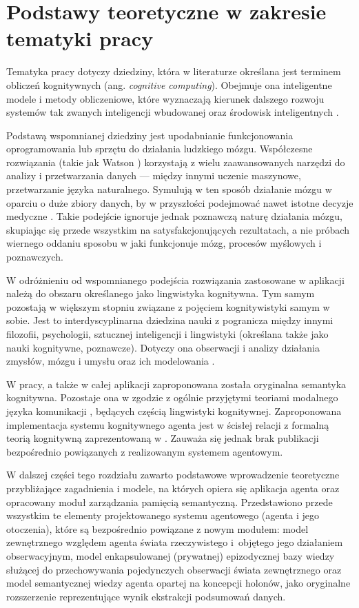 
\chapter{Podstawy teoretyczne w zakresie tematyki pracy}

Tematyka pracy dotyczy dziedziny, która w literaturze określana jest terminem obliczeń kognitywnych (ang. \textit{cognitive computing}). Obejmuje ona inteligentne modele i metody obliczeniowe, które wyznaczają kierunek dalszego rozwoju systemów tak zwanych inteligencji wbudowanej oraz środowisk inteligentnych \cite{hur15}.

Podstawą wspomnianej dziedziny jest upodabnianie funkcjonowania oprogramowania lub sprzętu do działania ludzkiego mózgu. Współczesne rozwiązania (takie jak  Watson \cite{kel13}) korzystają z wielu zaawansowanych narzędzi do analizy i przetwarzania danych --- między innymi uczenie maszynowe, przetwarzanie języka naturalnego. Symulują w ten sposób działanie mózgu w oparciu o duże zbiory danych, by w przyszłości podejmować nawet istotne decyzje medyczne \cite{woo15}. Takie podejście ignoruje jednak poznawczą naturę działania mózgu, skupiając się przede wszystkim na satysfakcjonujących rezultatach, a nie próbach wiernego oddaniu sposobu w jaki funkcjonuje mózg, procesów myślowych i poznawczych.

W odróżnieniu od wspomnianego podejścia rozwiązania zastosowane w aplikacji należą do obszaru określanego jako lingwistyka kognitywna. Tym samym pozostają w większym stopniu związane z pojęciem kognitywistyki samym w sobie. Jest to interdyscyplinarna dziedzina nauki z pogranicza między innymi filozofii, psychologii, sztucznej inteligencji i lingwistyki (określana także jako nauki kognitywne, poznawcze). Dotyczy ona obserwacji i analizy działania zmysłów, mózgu i umysłu oraz ich modelowania \cite{tha17}.

W pracy, a także w całej aplikacji zaproponowana została oryginalna semantyka kognitywna. Pozostaje ona w zgodzie z ogólnie przyjętymi teoriami modalnego języka komunikacji \cite{tal00}, będących częścią lingwistyki kognitywnej. Zaproponowana implementacja systemu kognitywnego agenta jest w ścisłej relacji z formalną teorią kognitywną zaprezentowaną w \cite{kat07}. Zauważa się jednak brak publikacji bezpośrednio powiązanych z realizowanym systemem agentowym.

W dalszej części tego rozdziału zawarto podstawowe wprowadzenie teoretyczne przybliżające zagadnienia i modele, na których opiera się aplikacja agenta oraz opracowany moduł zarządzania pamięcią semantyczną. Przedstawiono przede wszystkim te elementy projektowanego systemu agentowego (agenta i jego otoczenia), które są bezpośrednio powiązane z nowym modułem: model zewnętrznego względem agenta świata rzeczywistego i~objętego jego działaniem obserwacyjnym, model enkapsulowanej (prywatnej) epizodycznej bazy wiedzy służącej do przechowywania pojedynczych obserwacji świata zewnętrznego oraz model semantycznej wiedzy agenta opartej na koncepcji holonów, jako oryginalne rozszerzenie reprezentujące wynik ekstrakcji podsumowań danych.

